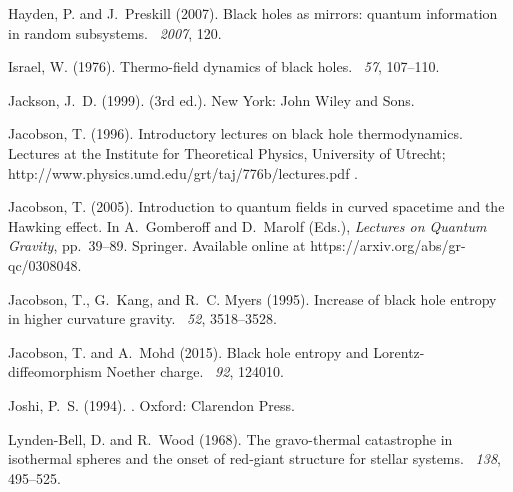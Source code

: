 \documentclass[12pt]{article}
\begin{document}
\begin{thebibliography}{}
Hayden, P. and J.~Preskill (2007).
\newblock Black holes as mirrors: quantum information in random subsystems.
~{\em 2007}, 120.

Israel, W. (1976).
\newblock Thermo-field dynamics of black holes.
~{\em 57}, 107--110.

Jackson, J.~D. (1999).
 (3rd ed.).
\newblock New York: John Wiley and Sons.

Jacobson, T. (1996).
\newblock Introductory lectures on black hole thermodynamics.
\newblock Lectures at the Institute for Theoretical Physics, University of
  Utrecht; http://www.physics.umd.edu/grt/taj/776b/lectures.pdf .

Jacobson, T. (2005).
\newblock Introduction to quantum fields in curved spacetime and the {H}awking
  effect.
\newblock In A.~Gomberoff and D.~Marolf (Eds.), {\em Lectures on Quantum
  Gravity}, pp.\  39--89. Springer.
\newblock Available online at https://arxiv.org/abs/gr-qc/0308048.

Jacobson, T., G.~Kang, and R.~C. Myers (1995).
\newblock Increase of black hole entropy in higher curvature gravity.
~{\em 52}, 3518--3528.

Jacobson, T. and A.~Mohd (2015).
\newblock Black hole entropy and {L}orentz-diffeomorphism {N}oether charge.
~{\em 92}, 124010.

Joshi, P.~S. (1994).
.
\newblock Oxford: Clarendon Press.

Lynden-Bell, D. and R.~Wood (1968).
\newblock The gravo-thermal catastrophe in isothermal spheres and the onset of
  red-giant structure for stellar systems.
~{\em 138},
  495--525.


\end{thebibliography}
\end{document}
